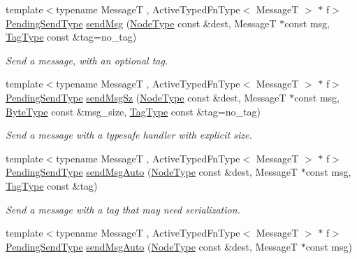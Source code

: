 \begin{DoxyCompactItemize}
{\footnotesize template$<$typename MessageT , Active\+Typed\+Fn\+Type$<$ Message\+T $>$ $\ast$ f$>$ }\\\hyperlink{structvt_1_1messaging_1_1_active_messenger_a3626a6ca76d8ad4ec7c3b47a2c70d3a8}{Pending\+Send\+Type} \hyperlink{group__typesafehan_ga1925bf9b7fd299f45a7bdcf3239fa262}{send\+Msg} (\hyperlink{namespacevt_a866da9d0efc19c0a1ce79e9e492f47e2}{Node\+Type} const \&dest, MessageT $\ast$const msg, \hyperlink{namespacevt_a84ab281dae04a52a4b243d6bf62d0e52}{Tag\+Type} const \&tag=no\+\_\+tag)
\begin{DoxyCompactList}\small\item\em Send a message, with an optional tag. \end{DoxyCompactList}\item 
{\footnotesize template$<$typename MessageT , Active\+Typed\+Fn\+Type$<$ Message\+T $>$ $\ast$ f$>$ }\\\hyperlink{structvt_1_1messaging_1_1_active_messenger_a3626a6ca76d8ad4ec7c3b47a2c70d3a8}{Pending\+Send\+Type} \hyperlink{group__typesafehan_ga542b5ab1a0df0b906fc8ebcd146f6f38}{send\+Msg\+Sz} (\hyperlink{namespacevt_a866da9d0efc19c0a1ce79e9e492f47e2}{Node\+Type} const \&dest, MessageT $\ast$const msg, \hyperlink{namespacevt_aab8d55968084610ce3b17057981e9300}{Byte\+Type} const \&msg\+\_\+size, \hyperlink{namespacevt_a84ab281dae04a52a4b243d6bf62d0e52}{Tag\+Type} const \&tag=no\+\_\+tag)
\begin{DoxyCompactList}\small\item\em Send a message with a typesafe handler with explicit size. \end{DoxyCompactList}\item 
{\footnotesize template$<$typename MessageT , Active\+Typed\+Fn\+Type$<$ Message\+T $>$ $\ast$ f$>$ }\\\hyperlink{structvt_1_1messaging_1_1_active_messenger_a3626a6ca76d8ad4ec7c3b47a2c70d3a8}{Pending\+Send\+Type} \hyperlink{group__typesafehan_ga84371d67ef22e1d96caceb5d5e14dad4}{send\+Msg\+Auto} (\hyperlink{namespacevt_a866da9d0efc19c0a1ce79e9e492f47e2}{Node\+Type} const \&dest, MessageT $\ast$const msg, \hyperlink{namespacevt_a84ab281dae04a52a4b243d6bf62d0e52}{Tag\+Type} const \&tag)
\begin{DoxyCompactList}\small\item\em Send a message with a tag that may need serialization. \end{DoxyCompactList}\item 
{\footnotesize template$<$typename MessageT , Active\+Typed\+Fn\+Type$<$ Message\+T $>$ $\ast$ f$>$ }\\\hyperlink{structvt_1_1messaging_1_1_active_messenger_a3626a6ca76d8ad4ec7c3b47a2c70d3a8}{Pending\+Send\+Type} \hyperlink{group__typesafehan_ga290810b32eb5fa3bd2be8bf19d9c62af}{send\+Msg\+Auto} (\hyperlink{namespacevt_a866da9d0efc19c0a1ce79e9e492f47e2}{Node\+Type} const \&dest, MessageT $\ast$const msg)

\end{DoxyCompactItemize}
